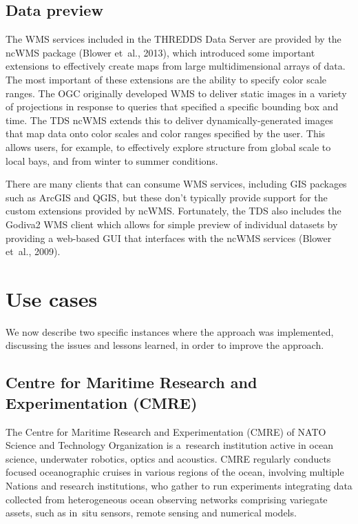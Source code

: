 \documentclass[osd, online, hvmath]{copernicus}
\begin{document}
\subsection{Data preview}

The WMS services included in the
THREDDS Data Server are provided by the ncWMS package (Blower et~al.,
2013), which introduced some important extensions to effectively create maps from large multidimensional arrays of data.  The most important of these extensions are the ability to specify color scale ranges.  The OGC originally developed WMS to deliver static images in a variety of projections in response to queries that specified a specific bounding box and time.  The TDS ncWMS extends this to deliver dynamically-generated images that map  data onto color scales and color ranges specified by the user.  This allows users, for example, to effectively explore structure from global scale to local bays, and from winter to summer conditions.  

There are many clients that can consume WMS services, including GIS packages such as ArcGIS and QGIS, but these don't typically provide support for the custom extensions provided by ncWMS.  Fortunately, the TDS also includes the Godiva2 WMS client which allows for simple preview of individual datasets by providing a web-based GUI that interfaces with the ncWMS services (Blower et~al., 2009).  

\section{Use cases}

We now describe two specific instances where the approach was
implemented,  discussing the issues and lessons learned, in order to improve the approach.

\subsection{Centre for Maritime Research and Experimentation (CMRE)}

The Centre for Maritime Research and Experimentation (CMRE) of NATO
Science and Technology Organization is a~research institution active
in ocean science, underwater robotics, optics and acoustics. 
CMRE regularly conducts focused oceanographic cruises in various regions of the ocean,
involving multiple Nations and research institutions, who gather to run
experiments integrating data collected from heterogeneous ocean
observing networks comprising variegate assets, such as in~situ sensors, remote sensing and numerical
models.
\end{document}
